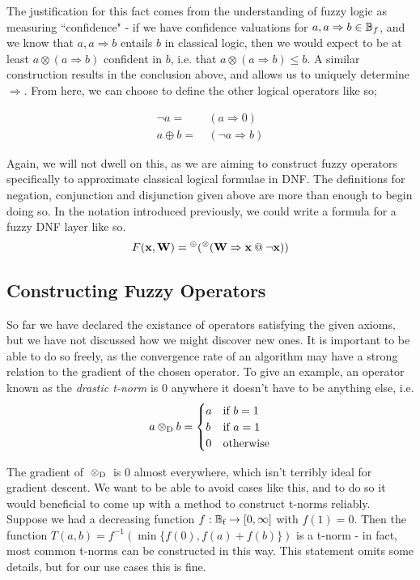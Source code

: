The justification for this fact comes from the understanding of fuzzy logic as measuring ``confidence" - if we have confidence valuations for $a, a \Rightarrow b \in \mathbb{B}_f$, and we know that $a, a \Rightarrow b$ entails $b$ in classical logic, then we would expect to be at least $a \otimes (a \Rightarrow b)$ confident in $b$, i.e. that $a \otimes (a \Rightarrow b) \leq b$. A similar construction results in the conclusion above, and allows us to uniquely determine $\Rightarrow$. From here, we can choose to define the other logical operators like so;

$$
\begin{aligned}
\lnot a =&\ (a \Rightarrow 0) \\
a \oplus b =&\ (\lnot a \Rightarrow b)
\end{aligned}
$$

Again, we will not dwell on this, as we are aiming to construct fuzzy operators specifically to approximate classical logical formulae in DNF. The definitions for negation, conjunction and disjunction given above are more than enough to begin doing so. In the notation introduced previously, we could write a formula for a fuzzy DNF layer like so.
$$
F(\mathbf{x, W}) = {^\oplus}({^\otimes}(\mathbf{W \Rightarrow x {\mspace{4mu}@\mspace{4mu}} \neg x}))$$

\subsection{Constructing Fuzzy Operators}

So far we have declared the existance of operators satisfying the given axioms, but we have not discussed how we might discover new ones. It is important to be able to do so freely, as the convergence rate of an algorithm may have a strong relation to the gradient of the chosen operator. To give an example, an operator known as the \textit{drastic t-norm} is 0 anywhere it doesn't have to be anything else, i.e.
$$a {\mspace{4mu}\otimes_\text{D}\mspace{4mu}} b = \begin{cases}
    a &\text{if } b = 1 \\
    b &\text{if } a = 1 \\
    0 &\text{otherwise}
\end{cases}$$

The gradient of ${\mspace{4mu}\otimes_\text{D}\mspace{4mu}}$ is 0 almost everywhere, which isn't terribly ideal for gradient descent. We want to be able to avoid cases like this, and to do so it would beneficial to come up with a method to construct t-norms reliably. Suppose we had a decreasing function $f:\mathbb{B}_\text{f} \to [0,\infty]$ with $f(1)=0$. Then the function $T(a,b) = f^{-1}(\min\{f(0), f(a) + f(b)\})$ is a t-norm - in fact, most common t-norms can be constructed in this way. This statement omits some details, but for our use cases this is fine.

